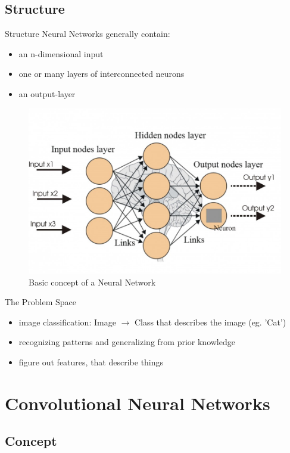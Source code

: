 \documentclass[12pt]{beamer}
\begin{document}
\subsection{Structure}
\begin{frame}{Structure}
Neural Networks generally contain:
  \begin{itemize}
     \item an n-dimensional input 
     \item one or many layers of interconnected neurons
     \item an output-layer
  \end{itemize}
\begin{figure}
\centering
\includegraphics[width=0.5\linewidth]{images/principle.jpg}
\caption{Basic concept of a Neural Network}
\label{fig:principle}

\end{figure}

\end{frame}

\begin{frame}{The Problem Space}
  \begin{itemize}
  \item image classification: Image $\rightarrow$ Class that describes the image (eg. 'Cat')
  \item recognizing patterns and generalizing from prior knowledge 
  \item figure out features, that describe things
  \end{itemize}
\end{frame}

\section{Convolutional Neural Networks}
\subsection{Concept}
\end{document}
